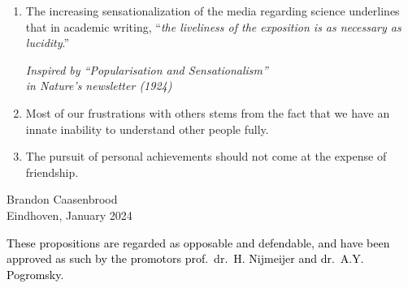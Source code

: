 \documentclass[a5paper]{article}
\begin{document}
\begin{enumerate}
  \item The increasing sensationalization of the media regarding science underlines that in academic writing, ``\textit{the liveliness of the exposition is as necessary as lucidity}.''
  \begin{flushright}
    \vspace{-2.75mm}
    \textit{Inspired by ``Popularisation and Sensationalism''\\ in Nature's newsletter (1924)}
    \vspace{-1mm}
  \end{flushright}  

  \item Most of our frustrations with others stems from the fact that we have an innate inability to understand other people fully.

  \item The pursuit of personal achievements should not come at the expense of friendship.


\end{enumerate}

\vspace{2mm}
\vfill
\begin{flushright}
Brandon Caasenbrood \\[0.15em]
Eindhoven, January 2024
\end{flushright} 

\begin{center}
\textcolor{black}{
\scriptsize These propositions are regarded as opposable and defendable, and have been approved as such by the promotors prof.\ dr.\ H. Nijmeijer and dr.\ A.Y. Pogromsky.
}
\end{center}
\end{document}
